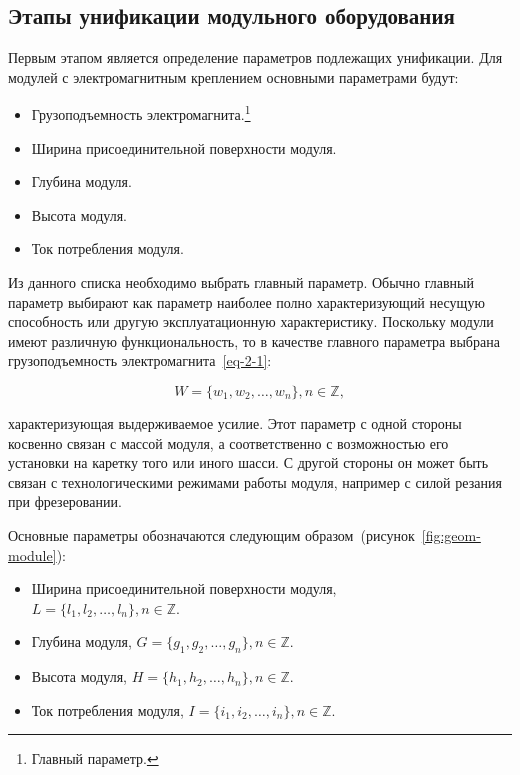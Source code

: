\subsection{Этапы унификации модульного оборудования}

Первым этапом является определение параметров подлежащих унификации. Для модулей с электромагнитным креплением основными параметрами будут:

\begin{itemize}
	\item Грузоподъемность электромагнита.\footnote{Главный параметр.}
	\item Ширина присоединительной поверхности модуля. 
	\item Глубина модуля.
	\item Высота модуля.
	\item Ток потребления модуля.
\end{itemize}


Из данного списка необходимо выбрать главный параметр. Обычно главный параметр выбирают как параметр наиболее полно характеризующий несущую способность или другую эксплуатационную характеристику. Поскольку модули имеют различную функциональность, то в качестве главного параметра выбрана грузоподъемность электромагнита~\cref{eq-2-1}:

\begin{equation}
W = \{w_1, w_2, \ldots, w_n\}, n \in \mathbb{Z},
\label{eq-2-1}
\end{equation}

\noindent характеризующая выдерживаемое усилие. Этот параметр с одной стороны косвенно связан с массой модуля, а соответственно с возможностью его установки на каретку того или иного шасси. С другой стороны он может быть связан с технологическими режимами работы модуля, например с силой резания при фрезеровании.

Основные параметры обозначаются следующим образом~(рисунок~\cref{fig:geom-module}):

\begin{itemize}
	\item Ширина присоединительной поверхности модуля,\\$L = \{l_1, l_2, \ldots, l_n\}, n \in \mathbb{Z}$.
	\item Глубина модуля, $G = \{g_1, g_2, \ldots, g_n\}, n \in \mathbb{Z}$.
	\item Высота модуля, $H = \{h_1, h_2, \ldots, h_n\}, n \in \mathbb{Z}$.
	\item Ток потребления модуля, $I = \{i_1, i_2, \ldots, i_n\}, n \in \mathbb{Z}$.
\end{itemize}

